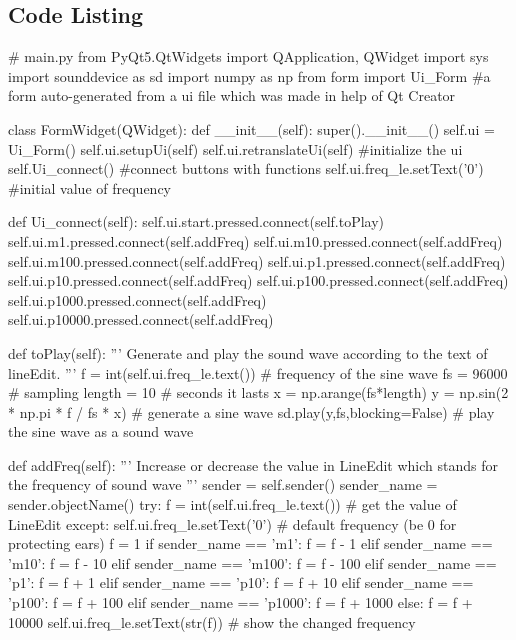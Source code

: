 \documentclass{article}
\begin{document}
\begin{appendices}
    \section{Code Listing}
    \begin{python}
    # main.py
    from PyQt5.QtWidgets import QApplication, QWidget
    import sys
    import sounddevice as sd
    import numpy as np
    from form import Ui_Form #a form auto-generated from a ui file which was made in help of Qt Creator

    class FormWidget(QWidget):
        def __init__(self):
            super().__init__()
            self.ui = Ui_Form()
            self.ui.setupUi(self)
            self.ui.retranslateUi(self) #initialize the ui
            self.Ui_connect() #connect buttons with functions
            self.ui.freq_le.setText('0') #initial value of frequency
        
        def Ui_connect(self):
            self.ui.start.pressed.connect(self.toPlay)
            self.ui.m1.pressed.connect(self.addFreq)
            self.ui.m10.pressed.connect(self.addFreq)
            self.ui.m100.pressed.connect(self.addFreq)
            self.ui.p1.pressed.connect(self.addFreq)
            self.ui.p10.pressed.connect(self.addFreq)
            self.ui.p100.pressed.connect(self.addFreq)
            self.ui.p1000.pressed.connect(self.addFreq)
            self.ui.p10000.pressed.connect(self.addFreq)

        def toPlay(self):
            '''
            Generate and play the sound wave according to the text of lineEdit.
            '''
            f = int(self.ui.freq_le.text()) # frequency of the sine wave
            fs = 96000 # sampling 
            length = 10 # seconds it lasts
            x = np.arange(fs*length)
            y = np.sin(2 * np.pi * f / fs * x) # generate a sine wave
            sd.play(y,fs,blocking=False) # play the sine wave as a sound wave
            
        def addFreq(self):
            '''
            Increase or decrease the value in LineEdit which stands for the frequency of sound wave
            '''
            sender = self.sender()
            sender_name = sender.objectName()
            try:
                f = int(self.ui.freq_le.text()) # get the value of LineEdit
            except:
                self.ui.freq_le.setText('0') # default frequency (be 0 for protecting ears)
                f = 1
            if sender_name == 'm1':
                f = f - 1
            elif sender_name == 'm10':
                f = f - 10
            elif sender_name == 'm100':
                f = f - 100
            elif sender_name == 'p1':
                f = f + 1
            elif sender_name == 'p10':
                f = f + 10
            elif sender_name == 'p100':
                f = f + 100
            elif sender_name == 'p1000':
                f = f + 1000
            else:
                f = f + 10000
            self.ui.freq_le.setText(str(f)) # show the changed frequency
            


\end{python}
\end{appendices}
\end{document}
